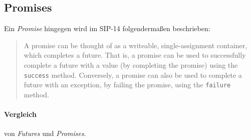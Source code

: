 


\subsection{Promises}

Ein \emph{Promise} hingegen wird im SIP-14 folgendermaßen beschrieben:
\begin{quote}
A promise can be thought of as a writeable, single-assignment container, which 
completes a future. That is, a promise can be used to successfully complete a 
future with a value (by \glqq completing\grqq{} the promise) using the \texttt{success} method. 
Conversely, a promise can also be used to complete a future with an exception, 
by failing the promise, using the \texttt{failure} method.
\end{quote}


\paragraph{Vergleich} von \emph{Futures} und \emph{Promises}.


